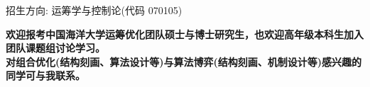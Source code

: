 %
%


{
招生方向: 运筹学与控制论(代码 070105)

\textcolor{BrickRed}{\textbf{欢迎报考中国海洋大学运筹优化团队硕士与博士研究生，也欢迎高年级本科生加入团队课题组讨论学习。\\
对组合优化(结构刻画、算法设计等)与算法博弈(结构刻画、机制设计等)感兴趣的同学可与我联系。}}

}